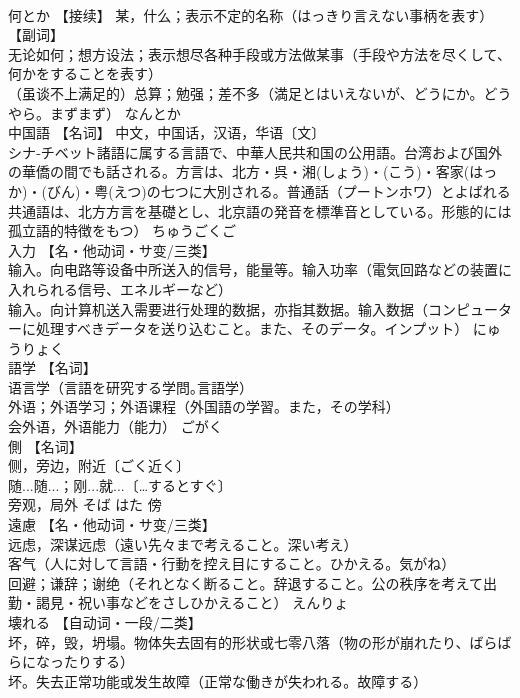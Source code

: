 \documentclass[8pt]{extreport}
\begin{document}
\begin{CJK}{UTF8}{min}
\\	何とか	【接续】 某，什么；表示不定的名称（はっきり言えない事柄を表す） 【副词】 
\\	无论如何；想方设法；表示想尽各种手段或方法做某事（手段や方法を尽くして、何かをすることを表す） 
\\	（虽谈不上满足的）总算；勉强；差不多（満足とはいえないが、どうにか。どうやら。まずまず）	なんとか	
\\	中国語	【名词】 中文，中国话，汉语，华语〔文〕
\\	シナ‐チベット諸語に属する言語で、中華人民共和国の公用語。台湾および国外の華僑の間でも話される。方言は、北方・呉・湘(しょう)・(こう)・客家(はっか)・(びん)・粤(えつ)の七つに大別される。普通話（プートンホワ）とよばれる共通語は、北方方言を基礎とし、北京語の発音を標準音としている。形態的には孤立語的特徴をもつ）	ちゅうごくご	
\\	入力	【名・他动词・サ变/三类】 
\\	输入。向电路等设备中所送入的信号，能量等。输入功率（電気回路などの装置に入れられる信号、エネルギーなど） 
\\	输入。向计算机送入需要进行处理的数据，亦指其数据。输入数据（コンピューターに処理すべきデータを送り込むこと。また、そのデータ。インプット）	にゅうりょく	
\\	語学	【名词】 
\\	语言学（言語を研究する学問｡言語学） 
\\	外语；外语学习；外语课程（外国語の学習。また，その学科） 
\\	会外语，外语能力（能力）	ごがく	
\\	側	【名词】 
\\	侧，旁边，附近〔ごく近く〕 
\\	随...随...；刚...就...〔…するとすぐ〕 
\\	旁观，局外	そば はた	傍
\\	遠慮	【名・他动词・サ变/三类】 
\\	远虑，深谋远虑（遠い先々まで考えること。深い考え） 
\\	客气（人に対して言語・行動を控え目にすること。ひかえる。気がね） 
\\	回避；谦辞；谢绝（それとなく断ること。辞退すること。公の秩序を考えて出勤・謁見・祝い事などをさしひかえること）	えんりょ	
\\	壊れる	【自动词・一段/二类】 
\\	坏，碎，毁，坍塌。物体失去固有的形状或七零八落（物の形が崩れたり、ばらばらになったりする） 
\\	坏。失去正常功能或发生故障（正常な働きが失われる。故障する） 

\end{CJK}
\end{document}
